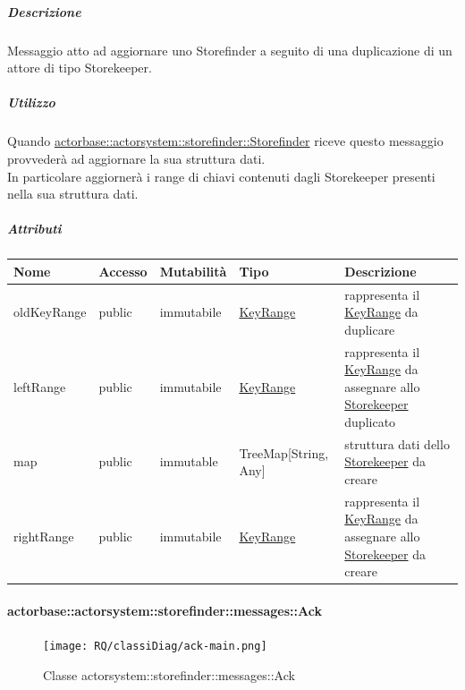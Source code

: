 \documentclass{scalatekids-article}
\begin{document}
\subparagraph{Descrizione}
Messaggio atto ad aggiornare uno Storefinder a seguito di una duplicazione
di un attore di tipo Storekeeper.\\

\subparagraph{Utilizzo}
Quando \hyperref[sec:actorbase::actorsystem::storefinder::Storefinder]{actorbase::\allowbreak{}actorsystem::\allowbreak{}storefinder::\allowbreak{}Storefinder}
riceve questo messaggio provvederà ad aggiornare la sua struttura dati.\\In
particolare aggiornerà i range di chiavi contenuti dagli Storekeeper presenti
nella sua struttura dati.

\subparagraph{Attributi}
\begin{tabular}{| p{3cm} | p{1.5cm} | p{2cm} | p{2cm} | p{8.5cm} |}
  \hline
  Nome & Accesso & Mutabilità & Tipo & Descrizione\\
  \hline
  oldKeyRange & public & immutabile & \hyperref[sec:actorbase::actorsystem::utils::KeyRange]{KeyRange} & rappresenta il \hyperref[sec:actorbase::actorsystem::utils::KeyRange]{KeyRange} da duplicare\\
  \hline
  leftRange & public & immutabile & \hyperref[sec:actorbase::actorsystem::utils::KeyRange]{KeyRange} & rappresenta il \hyperref[sec:actorbase::actorsystem::utils::KeyRange]{KeyRange} da assegnare allo \hyperref[sec:actorbase::actorsystem::storekeeper::Storekeeper]{Storekeeper} duplicato \\
  \hline
  map & public & immutable & TreeMap[String, Any] & struttura dati dello \hyperref[sec:actorbase::actorsystem::storekeeper::Storekeeper]{Storekeeper} da creare\\
  \hline
  rightRange & public & immutabile & \hyperref[sec:actorbase::actorsystem::utils::KeyRange]{KeyRange} & rappresenta il \hyperref[sec:actorbase::actorsystem::utils::KeyRange]{KeyRange} da assegnare allo \hyperref[sec:actorbase::actorsystem::storekeeper::Storekeeper]{Storekeeper} da creare\\
  \hline
\end{tabular}

\paragraph{actorbase::actorsystem::storefinder::messages::Ack}
\label{sec:actorbase::actorsystem::storefinder::messages::Ack}

\begin{figure}[H]
  \begin{center}
    \texttt{[image: RQ/classiDiag/ack-main.png]}
    \caption{Classe actorsystem::storefinder::messages::Ack}
  \end{center}
\end{figure}
\end{document}

